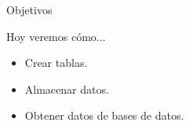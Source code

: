 \begin{frame}[t]{Objetivos}\vspace{10pt}

Hoy veremos cómo...

\begin{itemize}
	\item Crear tablas.
	\item Almacenar datos.
	\item Obtener datos de bases de datos.
\end{itemize}

\end{frame}